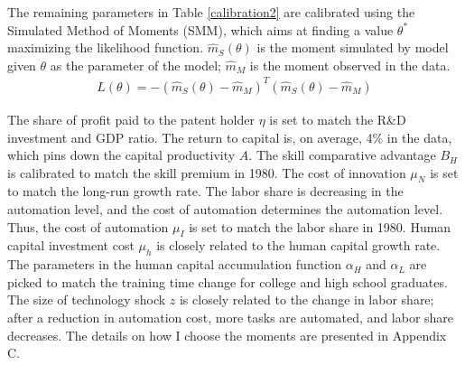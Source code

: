 \documentclass[12pt]{article}
\begin{document}
The remaining parameters in Table \ref{calibration2} are calibrated using the Simulated Method of Moments (SMM), which aims at finding a value $\theta^*$ maximizing the likelihood function. $\hat{m}_S(\theta)$ is the moment simulated by model given $\theta$ as the parameter of the model; $\hat{m}_M$ is the moment observed in the data.
\begin{align*}
L(\theta) = -(\hat{m}_S(\theta)-\hat{m}_M)^T(\hat{m}_S(\theta)-\hat{m}_M)
\end{align*}

The share of profit paid to the patent holder $\eta$ is set to match the R\&D investment and GDP ratio. The return to capital is, on average, 4\% in the data, which pins down the capital productivity $A$. The skill comparative advantage $B_H$ is calibrated to match the skill premium in 1980. The cost of innovation $\mu_N$ is set to match the long-run growth rate. The labor share is decreasing in the automation level, and the cost of automation determines the automation level. Thus, the cost of automation $\mu_I$ is set to match the labor share in 1980. Human capital investment cost $\mu_h$ is closely related to the human capital growth rate. The parameters in the human capital accumulation function $\alpha_H$ and $\alpha_L$ are picked to match the training time change for college and high school graduates. The size of technology shock $z$ is closely related to the change in labor share; after a reduction in automation cost, more tasks are automated, and labor share decreases. The details on how I choose the moments are presented in Appendix C.
\end{document}
